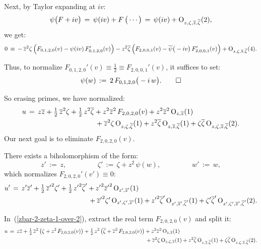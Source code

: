 \documentclass[12pt,twoside,leqno,openany]{amsart}
\begin{document}
Next, by Taylor expanding at $iv$:
\[
\psi\big(F+iv\big)
\,=\,
\psi(iv)
+
F\,\big(\cdots\big)
\,=\,
\psi(iv)
+
{\rm O}_{z,\zeta,\overline{z},\overline{\zeta}}(2),
\]
we get:
\[
0
\,\equiv\,
-\,
\overline{z}^2\zeta\,
\Big(
F_{0,1,2,0}(v)
-
\psi(iv)\,
F_{0,1,2,0}'(v)
\Big)
-
z^2\overline{\zeta}\,
\Big(
F_{2,0,0,1}(v)
-
\overline{\psi}\big(-iv\big)\,
F_{2,0,0,1}'(v)
\Big)
+
{\rm O}_{z,\zeta,\overline{z},\overline{\zeta}}(4).
\]

Thus, to normalize $F_{0,1,2,0}'(v) \equiv \frac{1}{2} \equiv
F_{2,0,0,1}'(v)$, it suffices to set:
\[
\psi(w)
\,:=\,
2\,F_{0,1,2,0}\big(-i\,w\big).
\qedhere
\]
\endproof

So erasing primes, we have normalized:
\leqnomode{}
\begin{align}
\label{zbar-2-zeta-1-over-2}
u
\,=\,
z\overline{z}
+
\tfrac{1}{2}\,
\overline{z}^2\zeta
+
\tfrac{1}{2}\,
z^2\overline{\zeta}
&
+
z^2\overline{z}^2\,
F_{2,0,2,0}(v)
+
z^2\overline{z}^2\,
{\rm O}_{z,\overline{z}}(1)
\notag
\\
&\,
+
\overline{z}^2\zeta\,
{\rm O}_{z,\zeta,\overline{\zeta}}(1)
+
z^2\overline{\zeta}\,
{\rm O}_{z,\overline{z},\overline{\zeta}}(1)
+
\zeta\overline{\zeta}\,
{\rm O}_{z,\zeta,\overline{z},\overline{\zeta}}(2).
\end{align}
Our next goal is to eliminate $F_{2,0,2,0}(v)$.

\begin{Lemma}
There exists a biholomorphism of the form:
\[
z'
\,:=\,
z,
\ \ \ \ \ \ \ \ \ \ \ \ \ \ \ \ \ \ \ \
\zeta'
\,:=\,
\zeta
+
z^2\,\psi(w),
\ \ \ \ \ \ \ \ \ \ \ \ \ \ \ \ \ \ \ \
w'
\,:=\,
w,
\]
which normalizes $F_{2,0,2,0}'(v') \equiv 0$:
\[
\aligned
u'
\,=\,
z'\overline{z}'
+
\tfrac{1}{2}\,
{\overline{z}'}^2\zeta'
+
\tfrac{1}{2}\,
{z'}^2\overline{\zeta}'
&
+
{z'}^2{\overline{z}'}^2\,
{\rm O}_{z',\overline{z}'}(1)
\\
&\,
+
{\overline{z}'}^2\zeta'\,
{\rm O}_{z',\zeta',\overline{z}'}(1)
+
{z'}^2{\overline{\zeta}'}\,
{\rm O}_{z',\overline{z}',\overline{\zeta}'}(1)
+
\zeta'\overline{\zeta}'\,
{\rm O}_{z',\zeta',\overline{z}',\overline{\zeta}'}(2).
\endaligned
\]
\end{Lemma}

\proof
In~({\ref{zbar-2-zeta-1-over-2}}), extract the real term
$F_{2,0,2,0}(v)$ and split it:
\leqnomode\usetagform{default}
\begin{align}
\label{split-F-2-0-2-0}
u
\,=\,
z\overline{z}
+
\tfrac{1}{2}\,
\overline{z}^2\,
\big(
\zeta
+
z^2\,F_{2,0,2,0}(v)
\big)
+
\tfrac{1}{2}\,
z^2\,
\big(
\overline{\zeta}
+
\overline{z}^2\,F_{2,0,2,0}(v)
\big)
&
+
z^2\overline{z}^2\,
{\rm O}_{z,\overline{z}}(1)
\notag
\\
&\,
+
\overline{z}^2\zeta\,
{\rm O}_{z,\zeta,\overline{z}}(1)
+
z^2\overline{\zeta}\,
{\rm O}_{z,\overline{z},\overline{\zeta}}(1)
+
\zeta\overline{\zeta}\,
{\rm O}_{z,\zeta,\overline{z},\overline{\zeta}}(2).
\end{align}
\end{document}
